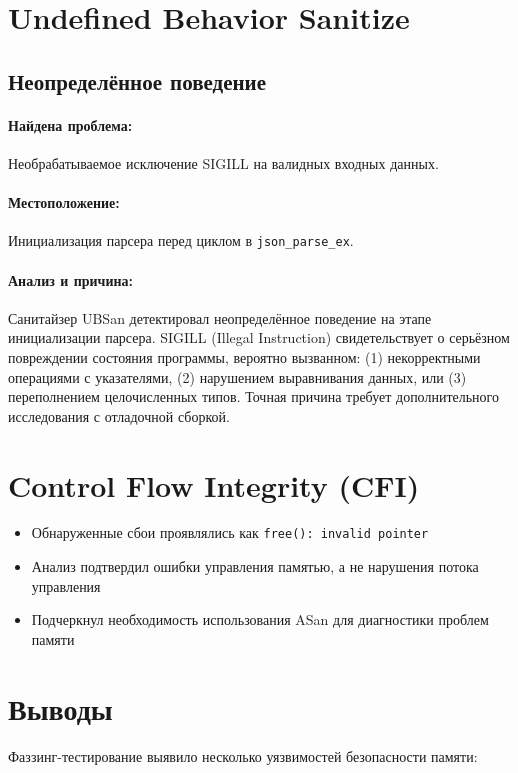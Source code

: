 \section{Undefined Behavior Sanitize}
\subsection{Неопределённое поведение}
\paragraph{Найдена проблема:} Необрабатываемое исключение SIGILL на валидных входных данных.

\paragraph{Местоположение:} Инициализация парсера перед циклом в \texttt{json\_parse\_ex}.

\paragraph{Анализ и причина:} Санитайзер UBSan детектировал неопределённое поведение на этапе инициализации парсера. SIGILL (Illegal Instruction) свидетельствует о серьёзном повреждении состояния программы, вероятно вызванном: (1) некорректными операциями с указателями, (2) нарушением выравнивания данных, или (3) переполнением целочисленных типов. Точная причина требует дополнительного исследования с отладочной сборкой.

\section{Control Flow Integrity (CFI)}
\begin{itemize}
    \item Обнаруженные сбои проявлялись как \texttt{free(): invalid pointer}
    \item Анализ подтвердил ошибки управления памятью, а не нарушения потока управления
    \item Подчеркнул необходимость использования ASan для диагностики проблем памяти
\end{itemize}

\section{Выводы}
Фаззинг-тестирование выявило несколько уязвимостей безопасности памяти:


